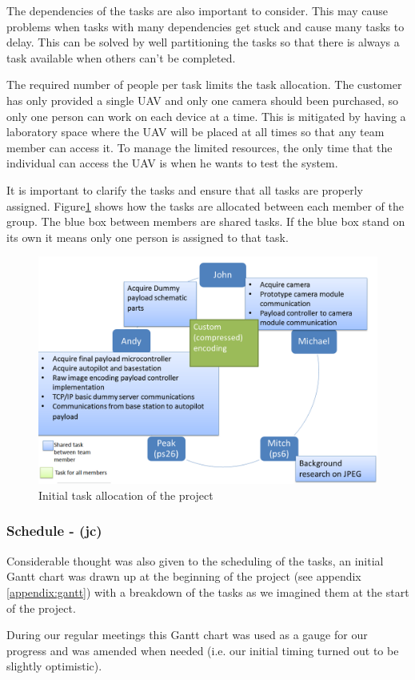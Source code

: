 The dependencies of the tasks are also important to consider. 
This may cause problems when tasks with many dependencies get stuck and cause many tasks to delay. 
This can be solved by well partitioning the tasks so that there is always a task available when others can't be completed. 

The required number of people per task limits the task allocation. The customer has only provided a single UAV and only one camera should been purchased, so only one person can work on each device at a time. This is mitigated by having a laboratory space where the UAV will be placed at all times so that any team member can access it. To manage the limited resources, the only time that the individual can access the UAV is when he wants to test the system. 

It is important to clarify the tasks and ensure that all tasks are properly assigned. 
Figure\ref{task allocation} shows how the tasks are allocated between each member of the group. 
The blue box between members are shared tasks. 
If the blue box stand on its own it means only one person is assigned to that task.

\begin{figure}[H]
\begin{center}
\includegraphics[width=1.0\textwidth]{figures/initial_task_allocation.png} 
\end{center}
\caption{Initial task allocation of the project\label{task allocation}}
\end{figure}

\subsubsection{Schedule - (jc)}
Considerable thought was also given to the scheduling of the tasks, an initial Gantt chart was drawn up
at the beginning of the project (see appendix \ref{appendix:gantt}) with a breakdown of the tasks as we
imagined them at the start of the project.

During our regular meetings this Gantt chart was used as a gauge for our progress and was amended when
needed (i.e. our initial timing turned out to be slightly optimistic).
